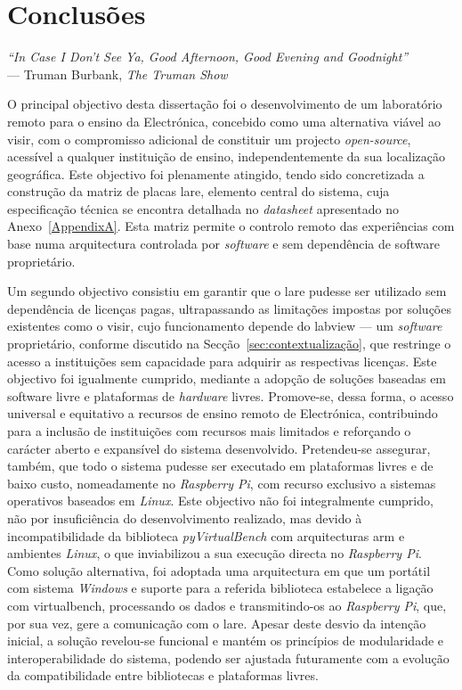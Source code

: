 \chapter{Conclusões}
\label{Capítulo6}
\begin{flushright}
\textit{``In Case I Don't See Ya, Good Afternoon, Good Evening and Goodnight''} \\[0.5em]
--- Truman Burbank, \textit{The Truman Show}
\end{flushright}
O principal objectivo desta dissertação foi o desenvolvimento de um laboratório remoto para o ensino da Electrónica, concebido como uma alternativa viável ao \acrshort{visir}, com o compromisso adicional de constituir um projecto \textit{open-source}, acessível a qualquer instituição de ensino, independentemente da sua localização geográfica. Este objectivo foi plenamente atingido, tendo sido concretizada a construção da matriz de placas \acrshort{lare}, elemento central do sistema, cuja especificação técnica se encontra detalhada no \textit{datasheet} apresentado no Anexo~\ref{AppendixA}. Esta matriz permite o controlo remoto das experiências com base numa arquitectura controlada por \textit{software} e sem dependência de software proprietário.

Um segundo objectivo consistiu em garantir que o \acrshort{lare} pudesse ser utilizado sem dependência de licenças pagas, ultrapassando as limitações impostas por soluções existentes como o \acrshort{visir}, cujo funcionamento depende do \acrshort{labview} — um \textit{software} proprietário, conforme discutido na Secção~\ref{sec:contextualização}, que restringe o acesso a instituições sem capacidade para adquirir as respectivas licenças. Este objectivo foi igualmente cumprido, mediante a adopção de soluções baseadas em software livre e plataformas de \textit{hardware} livres. Promove-se, dessa forma, o acesso universal e equitativo a recursos de ensino remoto de Electrónica, contribuindo para a inclusão de instituições com recursos mais limitados e reforçando o carácter aberto e expansível do sistema desenvolvido. Pretendeu-se assegurar, também, que todo o sistema pudesse ser executado em plataformas livres e de baixo custo, nomeadamente no \textit{Raspberry Pi}, com recurso exclusivo a sistemas operativos baseados em \textit{Linux}. Este objectivo não foi integralmente cumprido, não por insuficiência do desenvolvimento realizado, mas devido à incompatibilidade da biblioteca \textit{pyVirtualBench} com arquitecturas \acrshort{arm} e ambientes \textit{Linux}, o que inviabilizou a sua execução directa no \textit{Raspberry Pi}. Como solução alternativa, foi adoptada uma arquitectura em que um portátil com sistema \textit{Windows} e suporte para a referida biblioteca estabelece a ligação com \acrshort{virtualbench}, processando os dados e transmitindo-os ao \textit{Raspberry Pi}, que, por sua vez, gere a comunicação com o \acrshort{lare}. Apesar deste desvio da intenção inicial, a solução revelou-se funcional e mantém os princípios de modularidade e interoperabilidade do sistema, podendo ser ajustada futuramente com a evolução da compatibilidade entre bibliotecas e plataformas livres.

